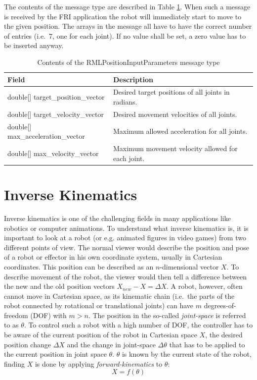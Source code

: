 The contents of the message type are described in Table \ref{tab:frimsg}. When such a message is received by the FRI application the robot will immediately start to move to the given position. The arrays in the message all have to have the correct number of entries (i.e.~7, one for each joint). If no value shall be set, a zero value has to be inserted anyway.


\begin{table}
	\caption{\label{tab:frimsg}Contents of the RMLPositionInputParameters message type}
	\begin{tabularx}{\linewidth}{|l|X|}
		\hline
		\textbf{Field} & \textbf{Description} \\
		\hline
		double[] target\_position\_vector & Desired target positions of all joints in radians. \\
		\hline
		double[] target\_velocity\_vector & Desired movement velocities of all joints. \\
		\hline
		double[] max\_acceleration\_vector & Maximum allowed acceleration for all joints. \\
		\hline
		double[] max\_velocity\_vector & Maximum movement velocity allowed for each joint. \\
		\hline
	\end{tabularx}
\end{table}

\section{Inverse Kinematics}

Inverse kinematics is one of the challenging fields in many applications like robotics or computer animations\cite{Starke2017}. To understand what inverse kinematics is, it is important to look at a robot (or e.g. animated figures in video games) from two different points of view. The normal viewer would describe the position and pose of a robot or effector in his own coordinate system, usually in Cartesian coordinates. This position can be described as an $n$-dimensional vector $X$. To describe movement of the robot, the viewer would then tell a difference between the new and the old position vectors $X_{new}-X=\Delta X$. A robot, however, often cannot move in Cartesian space, as its kinematic chain (i.e.~the parts of the robot connected by rotational or translational joints) can have $m$ degrees-of-freedom (DOF) with $m > n$. The position in the so-called \textit{joint-space} is referred to as $\theta$. To control such a robot with a high number of DOF, the controller has to be aware of the current position of the robot in Cartesian space $X$, the desired position change $\Delta X$ and the change in joint-space $\Delta \theta$ that has to be applied to the current position in joint space $\theta$. $\theta$ is known by the current state of the robot, finding $X$ is done by applying \textit{forward-kinematics} to $\theta$:
\begin{equation*}
	X = f(\theta)
\end{equation*}


